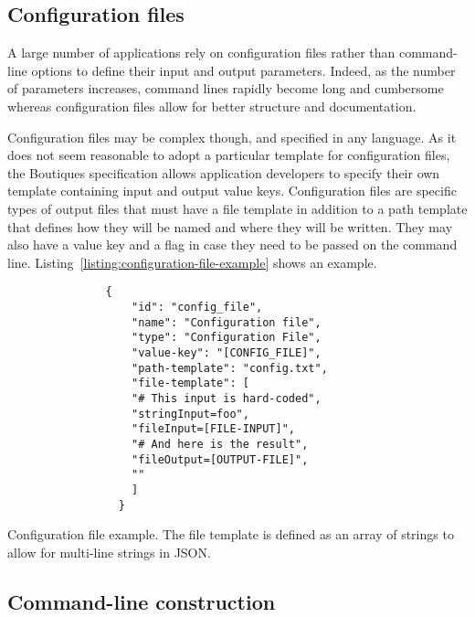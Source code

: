 \documentclass{article}
\newcommand{\boutiques}{Boutiques\xspace}
\begin{document}
\subsection{Configuration files}
\label{sec:configuration-files}
A large number of applications rely on configuration files rather than
command-line options to define their input and output
parameters. Indeed, as the number of parameters increases, command
lines rapidly become long and cumbersome whereas configuration files
allow for better structure and documentation.

Configuration files may be complex though, and specified in any
language.  As it does not seem reasonable to adopt a particular
template for configuration files, the \boutiques specification allows
application developers to specify their own template containing input
and output value keys. Configuration files are specific types of
output files that must have a file template in addition to a path
template that defines how they will be named and where they will be
written. They may also have a value key and a flag in case they need
to be passed on the command
line. Listing~\ref{listing:configuration-file-example} shows an
example.
\begin{listing}
\begin{verbatim}
               {
                   "id": "config_file",
                   "name": "Configuration file",
                   "type": "Configuration File",
                   "value-key": "[CONFIG_FILE]",
                   "path-template": "config.txt",
                   "file-template": [
                   "# This input is hard-coded",
                   "stringInput=foo",
                   "fileInput=[FILE-INPUT]",
                   "# And here is the result",
                   "fileOutput=[OUTPUT-FILE]",
                   ""
                   ]
                 }
\end{verbatim}
\caption{Configuration file example. The file template is defined as
  an array of strings to allow for multi-line strings in JSON.}
\label{listing:configuration-file-example}
\end{listing}

\subsection{Command-line construction}
\end{document}
